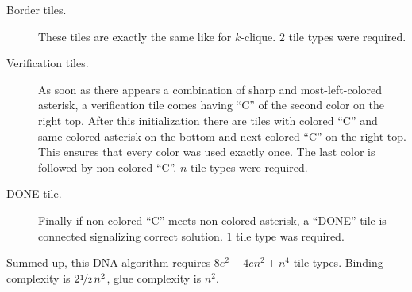 \begin{description}
\begin{description}
	\end{description}
	\item[Border tiles.] These tiles are exactly the same like for $k$-clique. $2$ tile types were required.
	\item[Verification tiles.] As soon as there appears a combination of sharp and most-left-colored asterisk, a verification tile comes having ``C'' of the second color on the right top. After this initialization there are tiles with colored ``C'' and same-colored asterisk on the bottom and next-colored ``C'' on the right top. This ensures that every color was used exactly once. The last color is followed by non-colored ``C''. $n$ tile types were required.
	\item[DONE tile.] Finally if non-colored ``C'' meets non-colored asterisk, a ``DONE'' tile is connected signalizing correct solution. $1$ tile type was required.
\end{description}

Summed up, this DNA algorithm requires $8e^2 - 4en^2 + n^4$ tile types. Binding complexity is $2\nicefrac{1}{2}\,n^2$, glue complexity is $n^2$.
